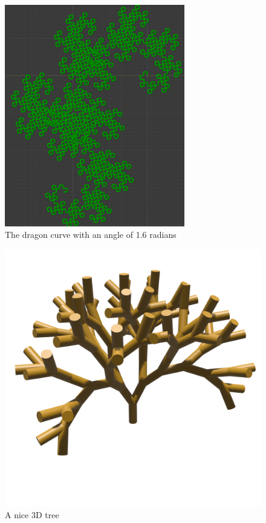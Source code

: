 \begin{figure}[h]
    \centering
    \includegraphics[width=0.7\textwidth]{figures/L-systems/dragon-1_6rad.png}
    \caption{The dragon curve with an angle of 1.6 radians}
\end{figure}

\begin{figure}[h]
    \centering
    \includegraphics[width=\textwidth]{figures/L-systems/tree1.png}
    \caption{A nice 3D tree}
\end{figure}

